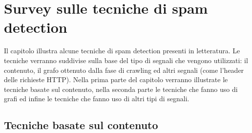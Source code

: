 \chapter{Survey sulle tecniche di spam detection}

Il capitolo illustra alcune tecniche di spam detection presenti in letteratura. Le tecniche verranno suddivise sulla base del tipo di segnali che vengono utilizzati: il contenuto, il grafo ottenuto dalla fase di crawling ed altri segnali (come l'header delle richieste HTTP). Nella prima parte del capitolo verranno illustrate le tecniche basate sul contenuto, nella seconda parte le tecniche che fanno uso di grafi ed infine le tecniche che fanno uso di altri tipi di segnali.

\section{Tecniche basate sul contenuto}

